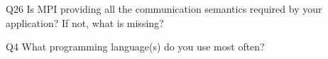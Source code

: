 \begin{description}%
\item{Q26} Is MPI providing all the communication semantics required by your application? If not, what is missing?%
\item{Q4} What programming language(s) do you use most often?%
\end{description}%
